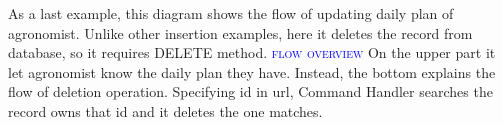 As a last example, this diagram shows the flow of updating daily plan of agronomist.
Unlike other insertion examples, here it deletes the record from database, so it requires DELETE method.
\newline
\textsc{\textcolor{blue}{flow overview}}
\newline
On the upper part it let agronomist know the daily plan they have. Instead, the bottom explains the flow of deletion operation. Specifying id in url, Command Handler searches the record owns that id and it deletes the one matches. 